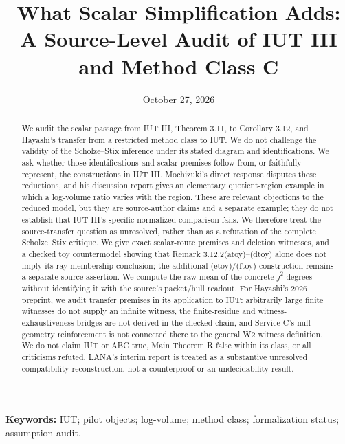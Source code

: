 \documentclass[11pt]{article}
\title{What Scalar Simplification Adds: A Source-Level Audit of IUT III and Method Class C}
\author{}
\date{October 27, 2026}
\begin{document}
\maketitle
\begin{abstract}
We audit the scalar passage from IUT III, Theorem 3.11, to Corollary 3.12, and Hayashi's transfer from a restricted method class to IUT. We do not challenge the validity of the Scholze--Stix inference under its stated diagram and identifications. We ask whether those identifications and scalar premises follow from, or faithfully represent, the constructions in IUT III. Mochizuki's direct response disputes these reductions, and his discussion report gives an elementary quotient-region example in which a log-volume ratio varies with the region. These are relevant objections to the reduced model, but they are source-author claims and a separate example; they do not establish that IUT III's specific normalized comparison fails. We therefore treat the source-transfer question as unresolved, rather than as a refutation of the complete Scholze--Stix critique. We give exact scalar-route premises and deletion witnesses, and a checked toy countermodel showing that Remark 3.12.2(atoy)--(dtoy) alone does not imply its ray-membership conclusion; the additional (etoy)/(ftoy) construction remains a separate source assertion. We compute the raw mean of the concrete $j^2$ degrees without identifying it with the source's packet/hull readout. For Hayashi's 2026 preprint, we audit transfer premises in its application to IUT: arbitrarily large finite witnesses do not supply an infinite witness, the finite-residue and witness-exhaustiveness bridges are not derived in the checked chain, and Service C's null-geometry reinforcement is not connected there to the general W2 witness definition. We do not claim IUT or ABC true, Main Theorem R false within its class, or all criticisms refuted. LANA's interim report is treated as a substantive unresolved compatibility reconstruction, not a counterproof or an undecidability result.
\end{abstract}
\noindent\textbf{Keywords:} IUT; pilot objects; log-volume; method class; formalization status; assumption audit.
\end{document}
